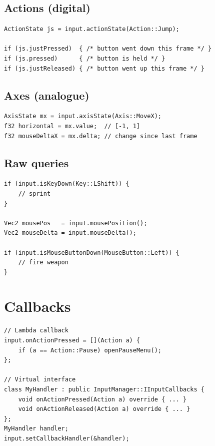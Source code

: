 \subsection{Actions (digital)}

\begin{lstlisting}
ActionState js = input.actionState(Action::Jump);

if (js.justPressed)  { /* button went down this frame */ }
if (js.pressed)      { /* button is held */ }
if (js.justReleased) { /* button went up this frame */ }
\end{lstlisting}

\subsection{Axes (analogue)}

\begin{lstlisting}
AxisState mx = input.axisState(Axis::MoveX);
f32 horizontal = mx.value;  // [-1, 1]
f32 mouseDeltaX = mx.delta; // change since last frame
\end{lstlisting}

\subsection{Raw queries}

\begin{lstlisting}
if (input.isKeyDown(Key::LShift)) {
    // sprint
}

Vec2 mousePos   = input.mousePosition();
Vec2 mouseDelta = input.mouseDelta();

if (input.isMouseButtonDown(MouseButton::Left)) {
    // fire weapon
}
\end{lstlisting}

\section{Callbacks}

\begin{lstlisting}
// Lambda callback
input.onActionPressed = [](Action a) {
    if (a == Action::Pause) openPauseMenu();
};

// Virtual interface
class MyHandler : public InputManager::IInputCallbacks {
    void onActionPressed(Action a) override { ... }
    void onActionReleased(Action a) override { ... }
};
MyHandler handler;
input.setCallbackHandler(&handler);
\end{lstlisting}

